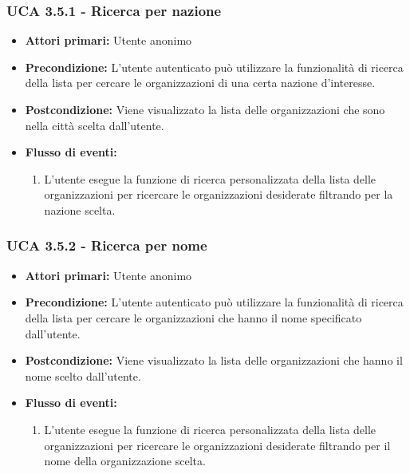 \subsubsection{UCA 3.5.1 - Ricerca per nazione}%
\begin{itemize}
	\item \textbf{Attori primari:} Utente anonimo
	\item \textbf{Precondizione:} L'utente autenticato può utilizzare la funzionalità di ricerca della lista per cercare le organizzazioni di una certa nazione d'interesse.
	\item \textbf{Postcondizione:} Viene visualizzato la lista delle organizzazioni che sono nella città scelta dall'utente.
	\item \textbf{Flusso di eventi:}
	\begin{enumerate}
		\item L'utente esegue la funzione di ricerca personalizzata della lista delle organizzazioni per ricercare le organizzazioni desiderate filtrando per la nazione scelta.
	\end{enumerate}
\end{itemize}

\subsubsection{UCA 3.5.2 - Ricerca per nome}%
\begin{itemize}
	\item \textbf{Attori primari:} Utente anonimo
	\item \textbf{Precondizione:} L'utente autenticato può utilizzare la funzionalità di ricerca della lista per cercare le organizzazioni che hanno il nome specificato dall'utente.
	\item \textbf{Postcondizione:} Viene visualizzato la lista delle organizzazioni che hanno il nome scelto dall'utente.
	\item \textbf{Flusso di eventi:}
	\begin{enumerate}
		\item L'utente esegue la funzione di ricerca personalizzata della lista delle organizzazioni per ricercare le organizzazioni desiderate filtrando per il nome della organizzazione scelta.
	\end{enumerate}
\end{itemize}

